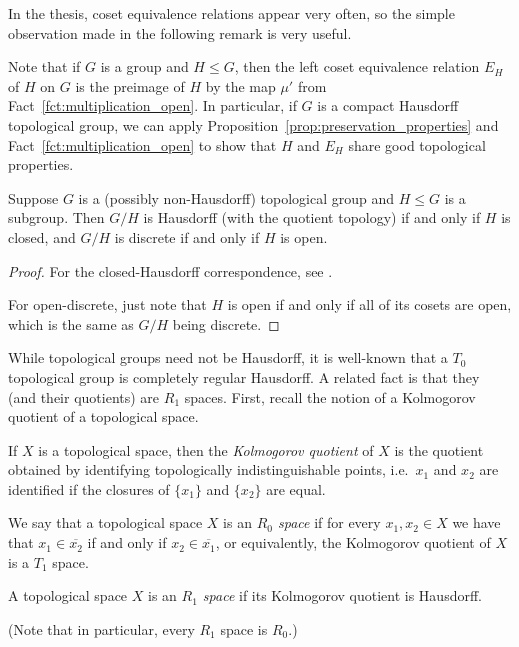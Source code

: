 	
	In the thesis, coset equivalence relations appear very often, so the simple observation made in the following remark is very useful.
	\begin{rem}
		\label{rem:group_to_cosets}
		Note that if $G$ is a group and $H\leq G$, then the left coset equivalence relation $E_H$ of $H$ on $G$ is the preimage of $H$ by the map $\mu'$ from Fact~\ref{fct:multiplication_open}. In particular, if $G$ is a compact Hausdorff topological group, we can apply Proposition~\ref{prop:preservation_properties} and Fact~\ref{fct:multiplication_open} to show that $H$ and $E_H$ share good topological properties.
		\xqed{\lozenge}
	\end{rem}
	
	\begin{fct}
		\label{fct:quotient_by_closed_subgroup}
		Suppose $G$ is a (possibly non-Hausdorff) topological group and $H\leq G$ is a subgroup. Then $G/H$ is Hausdorff (with the quotient topology) if and only if $H$ is closed, and $G/H$ is discrete if and only if $H$ is open.
	\end{fct}
	\begin{proof}
		For the closed-Hausdorff correspondence, see \cite[III.2.5, Proposition 13]{NB66}.
		
		For open-discrete, just note that $H$ is open if and only if all of its cosets are open, which is the same as $G/H$ being discrete.
	\end{proof}
	
	
	
	While topological groups need not be Hausdorff, it is well-known that a $T_0$ topological group is completely regular Hausdorff. A related fact is that they (and their quotients) are $R_1$ spaces. First, recall the notion of a Kolmogorov quotient of a topological space.
	
	\begin{dfn}
		\label{dfn:kolmogorov}
		If $X$ is a topological space, then the \emph{Kolmogorov quotient} of $X$ is the quotient obtained by identifying topologically indistinguishable points, i.e.\ $x_1$ and $x_2$ are identified if the closures of $\{x_1\}$ and $\{x_2\}$ are equal.\xqed{\lozenge}
	\end{dfn}
	
	
	
	\begin{dfn}
		\label{dfn:R0_R_1}
		\index{space!R0@$R_0$}
		We say that a topological space $X$ is an \emph{$R_0$ space} if for every $x_1,x_2\in X$ we have that $x_1\in \overline{x_2}$ if and only if $x_2\in \overline{x_1}$, or equivalently, the Kolmogorov quotient of $X$ is a $T_1$ space.
		
		\index{space!R1@$R_1$}
		A topological space $X$ is an \emph{$R_1$ space} if its Kolmogorov quotient is Hausdorff.\xqed{\lozenge}
	\end{dfn}
	(Note that in particular, every $R_1$ space is $R_0$.)
	

